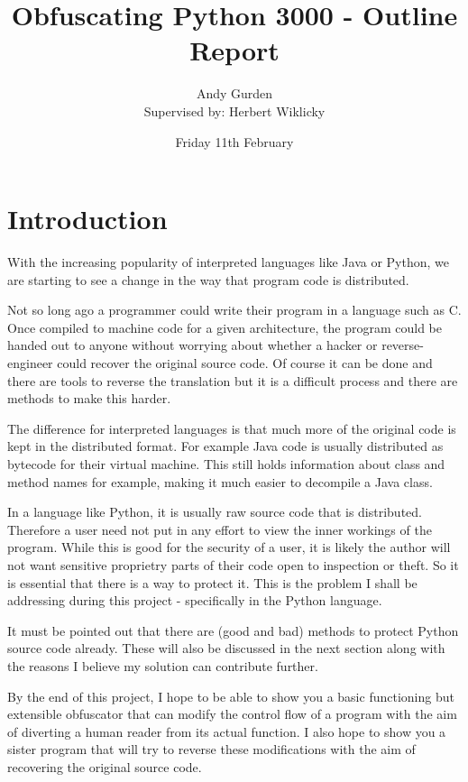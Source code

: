 \documentclass{report}
\title{Obfuscating Python 3000 - Outline Report}
\author{Andy Gurden\\Supervised by: Herbert Wiklicky}
\date{Friday 11th February}
\begin{document}
\maketitle

\section{Introduction}

With the increasing popularity of interpreted languages like Java or Python, we are starting
to see a change in the way that program code is distributed.

Not so long ago a programmer could write their program in a language such as C. Once compiled
to machine code for a given architecture, the program could be handed out to anyone without
worrying about whether a hacker or reverse-engineer could recover the original source code.
Of course it can be done and there are tools to reverse the translation\cite{cdecomp} but it
is a difficult process and there are methods to make this harder\cite{disres}.

The difference for interpreted languages is that much more of the original code is kept in the
distributed format. For example Java code is usually distributed as bytecode for their virtual
machine. This still holds information about class and method names for example\cite{classinfo},
making it much easier to decompile a Java class.

In a language like Python, it is usually raw source code that is distributed. Therefore a
user need not put in any effort to view the inner workings of the program. While this is good
for the security of a user\cite{noobf}, it is likely the author will not want sensitive
proprietry parts of their code open to inspection or theft. So it is essential that there is a
way to protect it. This is the problem I shall be addressing during this project - specifically
in the Python language.

It must be pointed out that there are (good and bad) methods to protect Python source code already.
These will also be discussed in the next section along with the reasons I believe my solution can
contribute further.

By the end of this project, I hope to be able to show you a basic functioning but extensible obfuscator
that can modify the control flow of a program with the aim of diverting a human reader from its actual
function. I also hope to show you a sister program that will try to reverse these modifications with the
aim of recovering the original source code.
\end{document}
